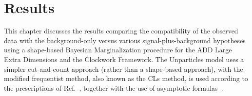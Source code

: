 \chapter{Results}\label{ch:results}
\RaggedRight \parindent=25pt
This chapter discusses the results comparing the compatibility of the observed data with the background-only versus various signal-plus-background hypotheses using a shape-based Bayesian Marginalization procedure for the ADD Large Extra Dimensions and the Clockwork Framework. The Unparticles model uses a simpler cut-and-count approach (rather than a shape-based approach), with the modified frequentist method, also known as the CLs method, is used according to the prescriptions of Ref.~\cite{ATLAS:1379837}, together with the use of asymptotic formulas~\cite{Cowan:2010js}.






